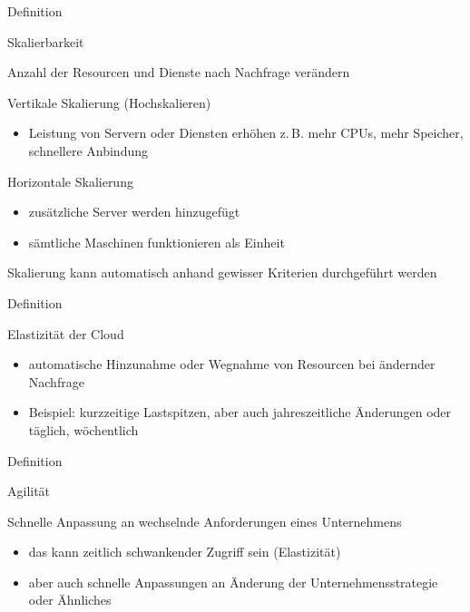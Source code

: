 \documentclass{scrartcl}
\newenvironment{flashcard}[2][]{%
    #1
    \vfill
    \centerline{\Large{#2}}
    \vfill
    \newpage
}
{\newpage}
\begin{document}
    \begin{flashcard}[Definition]{Skalierbarkeit}
        Anzahl der Resourcen und Dienste nach Nachfrage verändern
        
        \vspace{5mm}
        Vertikale Skalierung (Hochskalieren)
        \begin{itemize}
            \item Leistung von Servern oder Diensten erhöhen\newline
            z.\,B. mehr CPUs, mehr Speicher, schnellere Anbindung
        \end{itemize}
        
        Horizontale Skalierung
        \begin{itemize}
            \item zusätzliche Server werden hinzugefügt
            \item sämtliche Maschinen funktionieren als Einheit
        \end{itemize}

        \vspace{5mm}
        Skalierung kann automatisch anhand gewisser Kriterien durchgeführt werden
    \end{flashcard}

    \begin{flashcard}[Definition]{Elastizität der Cloud}
        \begin{itemize}
            \item automatische Hinzunahme oder Wegnahme von Resourcen bei ändernder Nachfrage
            \item Beispiel: kurzzeitige Lastspitzen, aber auch jahreszeitliche Änderungen oder täglich, wöchentlich
        \end{itemize}

    \end{flashcard}

    \begin{flashcard}[Definition]{Agilität}

        \vspace{5mm}
        Schnelle Anpassung an wechselnde Anforderungen eines Unternehmens
        \begin{itemize}
            \item das kann zeitlich schwankender Zugriff sein (Elastizität)
            \item aber auch schnelle Anpassungen an Änderung der Unternehmensstrategie oder Ähnliches
        \end{itemize}

    \end{flashcard}
\end{document}
